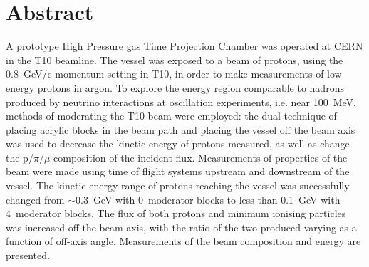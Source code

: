 \section{Abstract}

A prototype High Pressure gas Time Projection Chamber was operated at CERN in the T10 beamline. The vessel was exposed to a beam of protons, using the 0.8~GeV/c momentum setting in T10, in order to make measurements of low energy protons in argon.
To explore the energy region comparable to hadrons produced by neutrino interactions at oscillation experiments, i.e. near 100~MeV, methods of moderating the T10 beam were employed:
the dual technique of placing acrylic blocks in the beam path and placing the vessel off the beam axis was used to decrease the kinetic energy of protons measured, as well as change the p/$\pi$/$\mu$ composition of the incident flux.
Measurements of properties of the beam were made using time of flight systems upstream and downstream of the vessel. 
The kinetic energy range of protons reaching the vessel was successfully changed from $\sim$0.3~GeV with 0~moderator blocks to less than 0.1~GeV with 4~moderator blocks.
The flux of both protons and minimum ionising particles was increased off the beam axis, with the ratio of the two produced varying as a function of off-axis angle. 
Measurements of the beam composition and energy are presented.

